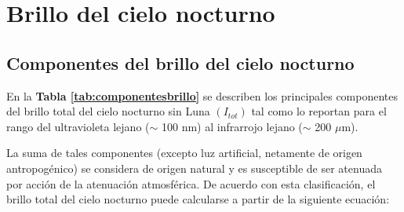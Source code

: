 \section{Brillo del cielo nocturno}
\label{sec:brillocielonocturno}

\subsection{Componentes del brillo del cielo nocturno}
\label{subsec:componentesbrillocielo}

En la \textbf{Tabla \ref{tab:componentesbrillo}} se describen los principales componentes del brillo total del cielo nocturno sin Luna $(I_{tot})$ tal como \cite{Leinert1998} lo reportan para el rango del ultravioleta lejano ($\sim$ 100 nm) al infrarrojo lejano ($\sim$ 200 $\mu$m).


\begin{table}[htb]
\centering
\caption{Componentes del brillo del cielo nocturno \citep{Leinert1998}}
\label{tab:componentesbrillo}
\end{table}

La suma de tales componentes (excepto luz artificial, netamente de origen antropogénico) se considera de origen natural y es susceptible de ser atenuada por acción de la atenuación atmosférica. De acuerdo con esta clasificación, el brillo total del cielo nocturno puede calcularse a partir de la siguiente ecuación:

